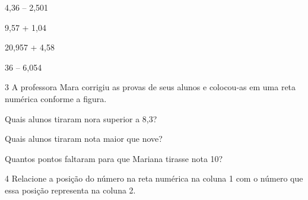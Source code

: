 {\begin{escolha}
\item
  4,36 -- 2,501


\item
  9,57 + 1,04


\item
  20,957 + 4,58


\item
  36 -- 6,054

\end{escolha}


\num{3} A professora Mara corrigiu as provas de seus alunos e colocou-as em
uma reta numérica conforme a figura.


\begin{escolha}
\item
  Quais alunos tiraram nora superior a 8,3?


\item
  Quais alunos tiraram nota maior que nove?


\item
  Quantos pontos faltaram para que Mariana tirasse nota 10?

\end{escolha}


\num{4} Relacione a posição do número na reta numérica na coluna 1 com o
número que essa posição representa na coluna 2.


}
